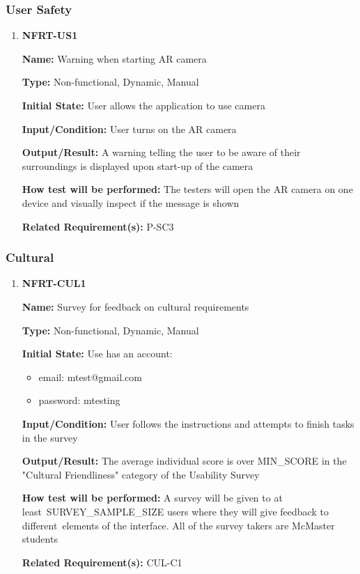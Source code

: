 \documentclass[12pt, titlepage]{article}
\begin{document}
\subsubsection{User Safety}
\begin{enumerate}
\item{\textbf{NFRT-US1}}

\textbf{Name:} Warning when starting AR camera

\textbf{Type:} Non-functional, Dynamic, Manual
					
\textbf{Initial State:} User allows the application to use camera
					
\textbf{Input/Condition:} User turns on the AR camera
					
\textbf{Output/Result:} A warning telling the user to be aware of their surroundings is displayed upon start-up of the camera

\textbf{How test will be performed:} The testers will open the AR camera on one device and visually inspect if the message is shown

\textbf{Related Requirement(s):} P-SC3
\end{enumerate}

\subsubsection{Cultural}
\begin{enumerate}
\item{\textbf{NFRT-CUL1}}

\textbf{Name:} Survey for feedback on cultural requirements

\textbf{Type:} Non-functional, Dynamic, Manual

\textbf{Initial State:} Use has an account:
\begin{itemize}
\item email: mtest@gmail.com
\item password: mtesting
\end{itemize}

\textbf{Input/Condition:} User follows the instructions and attempts to finish tasks in the survey

\textbf{Output/Result:} The average individual score is over MIN\_SCORE in the "Cultural Friendliness" category of the Usability Survey

\textbf{How test will be performed:} A survey will be given to at least\
SURVEY\_SAMPLE\_SIZE users where they will give feedback to different\
elements of the interface. All of the survey takers are McMaster students

\textbf{Related Requirement(s):} CUL-C1
\end{enumerate}
\end{document}
